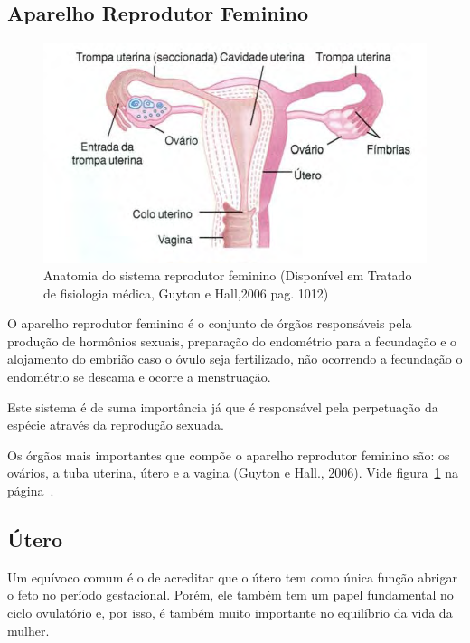 \documentclass[12pt]{article} %
\begin{document}
\subsection{Aparelho Reprodutor Feminino}
\begin{figure}[h!]
\centering
\includegraphics[width=13.9cm]{utero.png}
\caption[Anatomia do sistema reprodutor feminino]{Anatomia do sistema reprodutor feminino (Disponível em Tratado de fisiologia médica, Guyton e Hall,2006 pag. 1012)}
\label{fig:aparelho feminino}
\end{figure}

O aparelho reprodutor feminino é o conjunto de órgãos responsáveis
pela produção de hormônios sexuais, preparação do
endométrio para a fecundação e o alojamento do embrião caso o óvulo seja
fertilizado, não ocorrendo a fecundação o endométrio se descama e ocorre a menstruação. 

Este sistema é de suma
importância já que é responsável pela perpetuação da espécie através
da reprodução sexuada.

Os órgãos mais importantes que compõe o
aparelho reprodutor feminino são: os ovários, a tuba uterina, útero e
a vagina (Guyton e Hall., 2006). Vide figura~\ref{fig:aparelho feminino}
na página~\pageref{fig:aparelho feminino}.



\subsection{Útero}

Um equívoco comum é o de acreditar que o útero tem como única função
abrigar o feto no período gestacional. Porém, ele também tem um papel
fundamental no ciclo ovulatório e, por isso, é também muito importante
no equilíbrio da vida da mulher.
\end{document}
